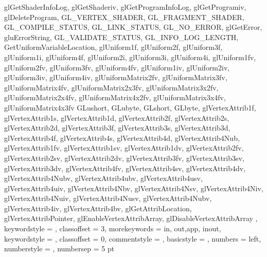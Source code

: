 {{{			glGetShaderInfoLog, glGetShaderiv, glGetProgramInfoLog, glGetProgramiv, glDeleteProgram, GL_VERTEX_SHADER, GL_FRAGMENT_SHADER, GL_COMPILE_STATUS, GL_LINK_STATUS, GL_NO_ERROR, glGetError,
			gluErrorString, GL_VALIDATE_STATUS, GL_INFO_LOG_LENGTH, GetUniformVariableLocation, glUniform1f, glUniform2f, glUniform3f, 
			glUniform1i, glUniform4f, glUniform2i, glUniform3i, glUniform4i,
			glUniform1fv, glUniform2fv, glUniform3fv, glUniform4fv,
			glUniform1iv, glUniform2iv, glUniform3iv, glUniform4iv,
			glUniformMatrix2fv, glUniformMatrix3fv, glUniformMatrix4fv, glUniformMatrix2x3fv, glUniformMatrix3x2fv, glUniformMatrix2x4fv, glUniformMatrix4x2fv, glUniformMatrix3x4fv, glUniformMatrix4x3fv
			GLushort, GLubyte, GLshort, GLbyte,
			glVertexAttrib1f, glVertexAttrib1s, glVertexAttrib1d,
			glVertexAttrib2f, glVertexAttrib2s, glVertexAttrib2d,
			glVertexAttrib3f, glVertexAttrib3s, glVertexAttrib3d,
			glVertexAttrib4f, glVertexAttrib4s, glVertexAttrib4d, glVertexAttrib4Nub,
			glVertexAttrib1fv, glVertexAttrib1sv, glVertexAttrib1dv,
			glVertexAttrib2fv, glVertexAttrib2sv, glVertexAttrib2dv,
			glVertexAttrib3fv, glVertexAttrib3sv, glVertexAttrib3dv,
			glVertexAttrib4fv, glVertexAttrib4sv, glVertexAttrib4dv, glVertexAttrib4Nubv,
			glVertexAttrib4ubv, glVertexAttrib4usv, glVertexAttrib4uiv, glVertexAttrib4Nbv, glVertexAttrib4Nsv, glVertexAttrib4Niv, glVertexAttrib4Nuiv, glVertexAttrib4Nusv, glVertexAttrib4Nubv,
			glVertexAttrib4iv, glVertexAttrib4bv, glGetAttribLocation, glVertexAttribPointer, glEnableVertexAttribArray, glDisableVertexAttribArray
		}, keywordstyle = {\color[rgb]{1.0, 0.0, 0.6}},
		classoffset = 3,
		morekeywords = {in, out,app, inout}, keywordstyle = {\color[rgb]{1.0, 0.0, 0.0}},
		classoffset = 0,
		commentstyle = {\color[rgb]{0.0, 0.5, 0.0}},
		basicstyle = \linespread{1}\scriptsize,
		numbers = left, numberstyle = \tiny, numbersep = 5 pt
	}
	
	\label{#3}
	\vspace{0.5\baselineskip}
	\noindent{}
	\begin{mdframed}[backgroundcolor = ListingBackgroundGray, linecolor = ListingBorderGray, linewidth = 0.25pt, skipabove = -0.5pt, skipbelow = 0.33\baselineskip, innertopmargin = 0pt, innerbottommargin = 0pt, innerleftmargin = 0pt, innerrightmargin = 0pt]
		
	\end{mdframed}
}


